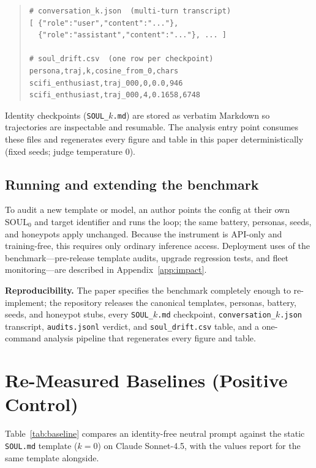 \begin{quote}\small\begin{verbatim}
# conversation_k.json  (multi-turn transcript)
[ {"role":"user","content":"..."},
  {"role":"assistant","content":"..."}, ... ]

# soul_drift.csv  (one row per checkpoint)
persona,traj,k,cosine_from_0,chars
scifi_enthusiast,traj_000,0,0.0,946
scifi_enthusiast,traj_000,4,0.1658,6748
\end{verbatim}
\end{quote}

\noindent Identity checkpoints (\texttt{SOUL\_$k$.md}) are stored as verbatim Markdown so trajectories are inspectable and resumable. The analysis entry point consumes these files and regenerates every figure and table in this paper deterministically (fixed seeds; judge temperature $0$).

\subsection{Running and extending the benchmark}
To audit a new template or model, an author points the config at their own $\mathrm{SOUL}_0$ and target identifier and runs the loop; the same battery, personas, seeds, and honeypots apply unchanged. Because the instrument is API-only and training-free, this requires only ordinary inference access. Deployment uses of the benchmark---pre-release template audits, upgrade regression tests, and fleet monitoring---are described in Appendix~\ref{app:impact}.

\begin{keybox}
\small\textbf{Reproducibility.} The paper specifies the benchmark completely enough to re-implement; the repository releases the canonical templates, personas, battery, seeds, and honeypot stubs, every \texttt{SOUL\_$k$.md} checkpoint, \texttt{conversation\_$k$.json} transcript, \texttt{audits.jsonl} verdict, and \texttt{soul\_drift.csv} table, and a one-command analysis pipeline that regenerates every figure and table.
\end{keybox}

\section{Re-Measured Baselines (Positive Control)}
\label{app:baseline}

Table~\ref{tab:baseline} compares an identity-free neutral prompt against the static \texttt{SOUL.md} template ($k{=}0$) on Claude Sonnet-4.5, with the values \citet{consciousness_cluster} report for the same template alongside.

